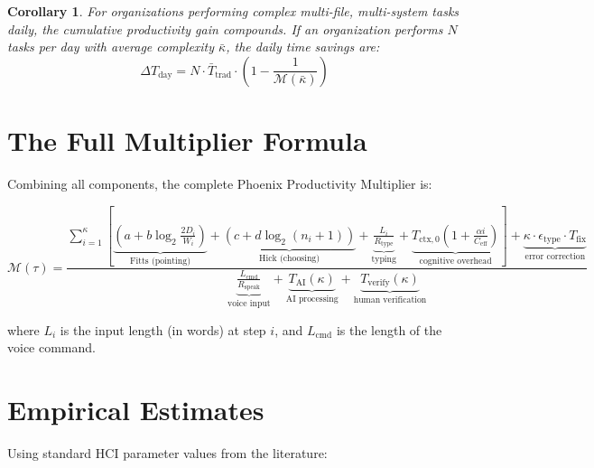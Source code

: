 \documentclass[11pt, a4paper]{article}
\newtheorem{corollary}{Corollary}
\begin{document}
\begin{corollary}
For organizations performing complex multi-file, multi-system tasks daily, the
cumulative productivity gain compounds. If an organization performs $N$ tasks per
day with average complexity $\bar{\kappa}$, the daily time savings are:
\begin{equation}
  \Delta T_{\text{day}} = N \cdot \bar{T}_{\text{trad}} \cdot \left(1 - \frac{1}{\mathcal{M}(\bar{\kappa})}\right)
\end{equation}
\end{corollary}

\section{The Full Multiplier Formula}

Combining all components, the complete Phoenix Productivity Multiplier is:

\begin{equation}
\boxed{
  \mathcal{M}(\tau) = \frac{
    \displaystyle\sum_{i=1}^{\kappa}\left[
      \underbrace{\left(a + b\log_2\frac{2D_i}{W_i}\right)}_{\text{Fitts (pointing)}}
      + \underbrace{\left(c + d\log_2(n_i+1)\right)}_{\text{Hick (choosing)}}
      + \underbrace{\frac{L_i}{R_{\text{type}}}}_{\text{typing}}
      + \underbrace{T_{\text{ctx},0}\!\left(1 + \frac{\alpha i}{C_{\text{eff}}}\right)}_{\text{cognitive overhead}}
    \right]
    + \underbrace{\kappa \cdot \epsilon_{\text{type}} \cdot T_{\text{fix}}}_{\text{error correction}}
  }{
    \underbrace{\frac{L_{\text{cmd}}}{R_{\text{speak}}}}_{\text{voice input}}
    + \underbrace{T_{\text{AI}}(\kappa)}_{\text{AI processing}}
    + \underbrace{T_{\text{verify}}(\kappa)}_{\text{human verification}}
  }
}
\label{eq:full}
\end{equation}

where $L_i$ is the input length (in words) at step $i$, and $L_{\text{cmd}}$ is
the length of the voice command.

\section{Empirical Estimates}

Using standard HCI parameter values from the literature:
\end{document}
